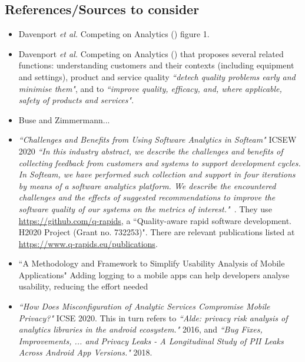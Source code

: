 \subsection{References/Sources to consider}
\begin{itemize}

    \item Davenport \textit{et al.} Competing on Analytics (\cite{davenport2017competing_on_analytics}) figure 1.
    
    \item Davenport \textit{et al.} Competing on Analytics (\cite{davenport2006competing_on_analytics}) that proposes several related functions: understanding customers and their contexts (including equipment and settings), product and service quality \emph{``detech quality problems early and minimise them"}, and to \emph{``improve quality, efficacy, and, where applicable, safety of products and services"}.
    
    \item Buse and Zimmermann...~\cite{buse_analytics_2010} 
    
    \item \emph{``Challenges and Benefits from Using Software Analytics in Softeam"} ICSEW 2020 \emph{``In this industry abstract, we describe the challenges and benefits of collecting feedback from customers and systems to support development cycles. In Softeam, we have performed such collection and support in four iterations by means of a software analytics platform. We describe the encountered challenges and the effects of suggested recommendations to improve the software quality of our systems on the metrics of interest."}~\cite{bagnato2020_challenges_and_benefits_from_using_software_analytics_in_softeam}. They use \url{https://github.com/q-rapids}, a ``Quality-aware rapid software development. H2020 Project (Grant no. 732253)". There are relevant publications listed at \url{https://www.q-rapids.eu/publications}.
    
    \item ``A Methodology and Framework to Simplify Usability Analysis of Mobile Applications" Adding logging to a mobile apps can help developers analyse usability, reducing the effort needed
    
    \item \emph{``How Does Misconfiguration of Analytic Services Compromise Mobile Privacy?"} ICSE 2020. This in turn refers to \emph{``Alde: privacy risk analysis of analytics libraries in the android ecosystem."} 2016, and \emph{``Bug Fixes, Improvements, ... and Privacy Leaks - A Longitudinal Study of PII Leaks Across Android App Versions."} 2018.


\end{itemize}
